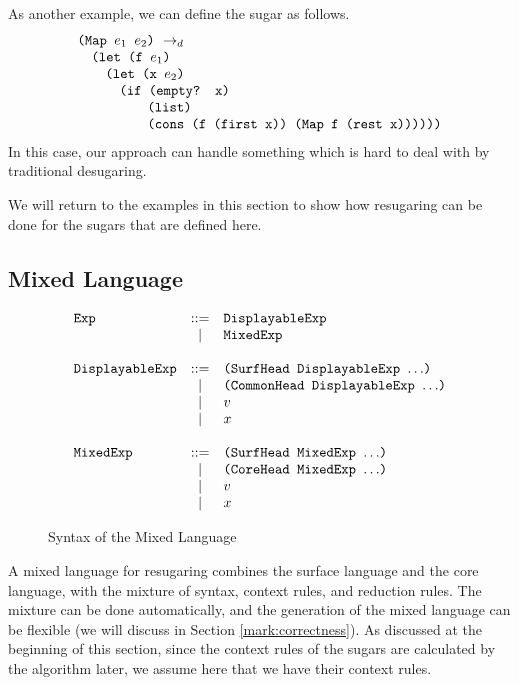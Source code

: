 As another example, we can define the  sugar as follows.
\[
\begin{array}{l}
\texttt{(Map $e_1$ $e_2$)} ~\rightarrow_d~\\
\quad\texttt{(let (f $e_1$)}\\
\qquad\texttt{(let (x $e_2$)}\\
\qquad\quad

\texttt{(if (empty? x)}\\
\qquad\qquad\quad\texttt{(list)}\\
\qquad\qquad\quad\texttt{(cons (f (first x)) (Map f (rest x))))))}
\end{array}
\]
In this case, our approach can handle something which is hard to deal with by traditional desugaring.

\medskip
We will return to the examples in this section to show how resugaring can be done for the  sugars that are defined here.



\subsection{Mixed Language}
\begin{figure}[t]
\begin{centering}
{\footnotesize
\[
			\begin{array}{lcl}
			\mbox{\tt Exp} &::=& \mbox{\tt DisplayableExp}\\
			&|& \mbox{\tt MixedExp}\\
			\\
			\mbox{\tt DisplayableExp} &::=& \mbox{\tt (SurfHead~DisplayableExp~$\ldots$)}\\
			&|& \mbox{\tt (CommonHead~DisplayableExp~$\ldots$)}\\
			&|& v\\
			&|& x\\
			\\
			\mbox{\tt MixedExp} &::=& \mbox{\tt (SurfHead~MixedExp~$\ldots$)}\\
			&|& \mbox{\tt (CoreHead~MixedExp~$\ldots$)}\\
			&|& v\\
			&|& x\\
			\end{array}
			\]
}

\end{centering}
\caption{Syntax of the Mixed Language}
\label{fig:mix}
\end{figure}

A mixed language for resugaring combines the surface language and the core language, with the mixture of syntax, context rules, and reduction rules. The mixture can be done automatically, and the generation of the mixed language can be flexible (we will discuss in Section \ref{mark:correctness}). As discussed at the beginning of this section, since the context rules of the sugars are calculated by the algorithm later, we assume here that we have their context rules.


